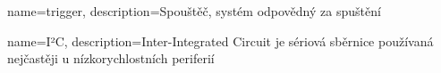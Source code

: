%

{
    name=trigger,
    description={Spouštěč, systém odpovědný za spuštění }
}

{
    name=I²C,
    description={Inter-Integrated Circuit je sériová sběrnice používaná nejčastěji u
    nízkorychlostních periferií}
}